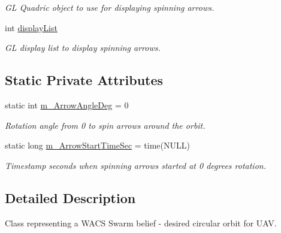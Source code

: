 \begin{DoxyCompactItemize}
\begin{DoxyCompactList}\small\item\em GL Quadric object to use for displaying spinning arrows. \end{DoxyCompactList}\item 
\hypertarget{class_circular_orbit_belief_a77d95f2ab2ad4cbb9e95e93321cf1e14}{
int \hyperlink{class_circular_orbit_belief_a77d95f2ab2ad4cbb9e95e93321cf1e14}{displayList}}
\label{class_circular_orbit_belief_a77d95f2ab2ad4cbb9e95e93321cf1e14}

\begin{DoxyCompactList}\small\item\em GL display list to display spinning arrows. \end{DoxyCompactList}\end{DoxyCompactItemize}
\subsection*{Static Private Attributes}
\begin{DoxyCompactItemize}
\item 
\hypertarget{class_circular_orbit_belief_a6edd05988001f9e983770e8baa6f452b}{
static int \hyperlink{class_circular_orbit_belief_a6edd05988001f9e983770e8baa6f452b}{m\_\-ArrowAngleDeg} = 0}
\label{class_circular_orbit_belief_a6edd05988001f9e983770e8baa6f452b}

\begin{DoxyCompactList}\small\item\em Rotation angle from 0 to spin arrows around the orbit. \end{DoxyCompactList}\item 
\hypertarget{class_circular_orbit_belief_a2c653a3cc50135db213cd52684cce06d}{
static long \hyperlink{class_circular_orbit_belief_a2c653a3cc50135db213cd52684cce06d}{m\_\-ArrowStartTimeSec} = time(NULL)}
\label{class_circular_orbit_belief_a2c653a3cc50135db213cd52684cce06d}

\begin{DoxyCompactList}\small\item\em Timestamp seconds when spinning arrows started at 0 degrees rotation. \end{DoxyCompactList}\end{DoxyCompactItemize}


\subsection{Detailed Description}
Class representing a WACS Swarm belief -\/ desired circular orbit for UAV. 


